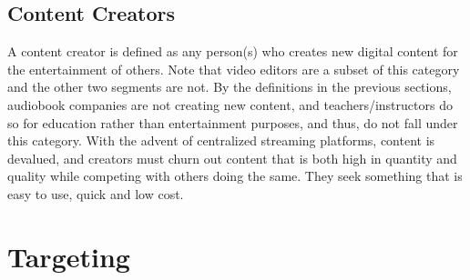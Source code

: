 \documentclass[letterpaper]{article}
\begin{document}
    \subsection{Content Creators}
        A content creator is defined as any person(s) who creates new digital content for the entertainment of others. Note that video editors are a subset of this category and the other two segments are not. By the definitions in the previous sections, audiobook companies are not creating new content, and teachers/instructors do so for education rather than entertainment purposes, and thus, do not fall under this category. With the advent of centralized streaming platforms, content is devalued, and creators must churn out content that is both high in quantity and quality while competing with others doing the same. They seek something that is easy to use, quick and low cost.
\section{Targeting}
\end{document}
